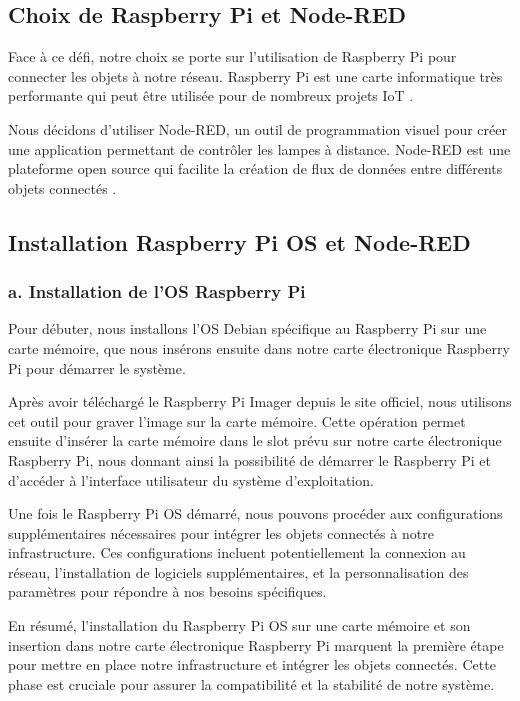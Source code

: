 \subsection{Choix de Raspberry Pi et Node-RED}

Face à ce défi, notre choix se porte sur l'utilisation de Raspberry Pi pour connecter les objets à notre réseau. Raspberry Pi est une carte informatique très performante qui peut être utilisée pour de nombreux projets IoT \cite{richardson2012getting}.

Nous décidons d'utiliser Node-RED, un outil de programmation visuel pour créer une application permettant de contrôler les lampes à distance. Node-RED est une plateforme open source qui facilite la création de flux de données entre différents objets connectés \cite{lekic2018iot}.


\subsection{Installation Raspberry Pi OS et Node-RED}

\subsubsection{a. Installation de l'OS Raspberry Pi}

Pour débuter, nous installons l'OS Debian spécifique au Raspberry Pi sur une carte mémoire, que nous insérons ensuite dans notre carte électronique Raspberry Pi pour démarrer le système.

Après avoir téléchargé le Raspberry Pi Imager depuis le site officiel, nous utilisons cet outil pour graver l'image sur la carte mémoire. Cette opération permet ensuite d'insérer la carte mémoire dans le slot prévu sur notre carte électronique Raspberry Pi, nous donnant ainsi la possibilité de démarrer le Raspberry Pi et d'accéder à l'interface utilisateur du système d'exploitation.

Une fois le Raspberry Pi OS démarré, nous pouvons procéder aux configurations supplémentaires nécessaires pour intégrer les objets connectés à notre infrastructure. Ces configurations incluent potentiellement la connexion au réseau, l'installation de logiciels supplémentaires, et la personnalisation des paramètres pour répondre à nos besoins spécifiques.

En résumé, l'installation du Raspberry Pi OS sur une carte mémoire et son insertion dans notre carte électronique Raspberry Pi marquent la première étape pour mettre en place notre infrastructure et intégrer les objets connectés. Cette phase est cruciale pour assurer la compatibilité et la stabilité de notre système.


